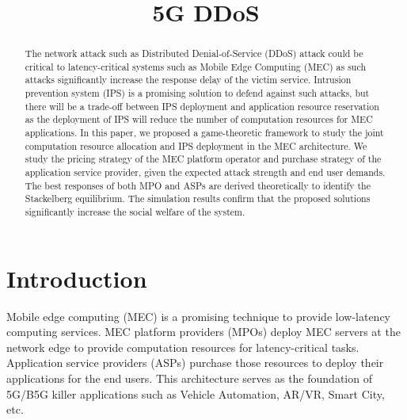 \documentclass[conference]{IEEEtran}
\begin{document}
\title{5G DDoS}
\author{
}
\maketitle

\begin{abstract}
The network attack such as Distributed Denial-of-Service (DDoS) attack could be critical to latency-critical systems such as Mobile Edge Computing (MEC) as such attacks significantly increase the response delay of the victim service. Intrusion prevention system (IPS) is a promising solution to defend against such attacks, but there will be a trade-off between IPS deployment and application resource reservation as the deployment of IPS will reduce the number of computation resources for MEC applications. In this paper, we proposed a game-theoretic framework to study the joint computation resource allocation and IPS deployment in the MEC architecture. We study the pricing strategy of the MEC platform operator and purchase strategy of the application service provider, given the expected attack strength and end user demands. The best responses of both MPO and ASPs are derived theoretically to identify the Stackelberg equilibrium. The simulation results confirm that the proposed solutions significantly increase the social welfare of the system.
\end{abstract}

\section{Introduction}
Mobile edge computing (MEC) is a promising technique to provide low-latency computing services. MEC platform providers (MPOs) deploy MEC servers at the network edge to provide computation resources for latency-critical tasks. Application service providers (ASPs) purchase those resources to deploy their applications for the end users. This architecture serves as the foundation of 5G/B5G killer applications such as Vehicle Automation, AR/VR, Smart City, etc.
\end{document}
